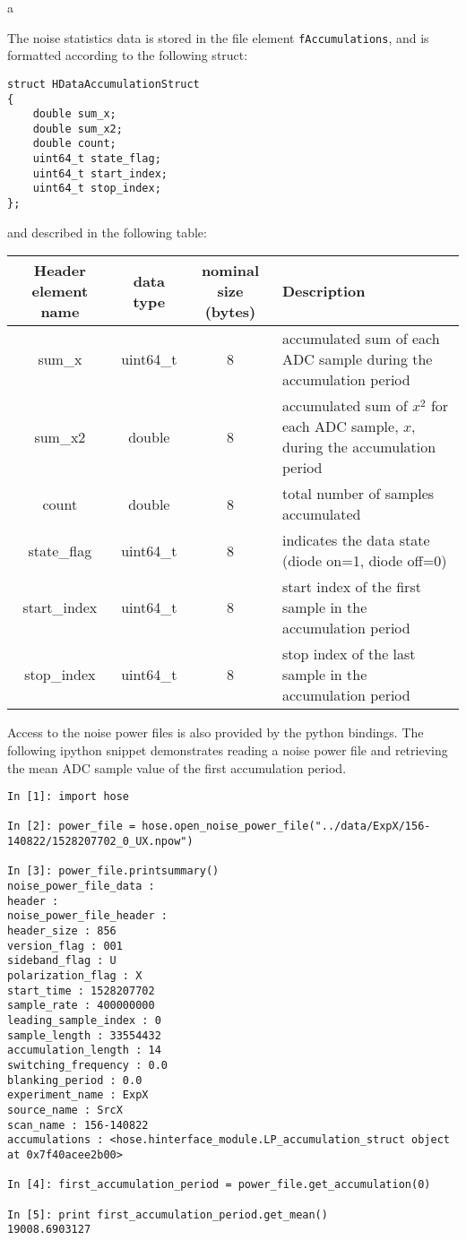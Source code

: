 a\documentclass[a4paper,14pt]{article}
\begin{document}
The noise statistics data is stored in the file element \verb|fAccumulations|, and is formatted
according to the following struct:

\begin{lstlisting}
struct HDataAccumulationStruct
{
    double sum_x; 
    double sum_x2;
    double count;
    uint64_t state_flag;
    uint64_t start_index;
    uint64_t stop_index;
};
\end{lstlisting}

and described in the following table:

\begin{center}
\begin{tabularx}{\linewidth} {| c | c | c | L |}
\hline
 Header element name & data type & nominal size (bytes) & Description \\  \hline
 sum\_x  & uint64\_t & 8 & accumulated sum of each ADC sample during the accumulation period \\ \hline
 sum\_x2  & double & 8 & accumulated sum of $x^2$ for each ADC sample, $x$, during the accumulation period \\ \hline
 count  & double & 8 & total number of samples accumulated \\ \hline
 state\_flag & uint64\_t & 8 & indicates the data state (diode on=1, diode off=0) \\ \hline
 start\_index & uint64\_t & 8 & start index of the first sample in the accumulation period \\ \hline
 stop\_index & uint64\_t & 8 & stop index of the last sample in the accumulation period \\ \hline
\end{tabularx}
\end{center}

Access to the noise power files is also provided by the python bindings. The following ipython snippet demonstrates reading a noise power file and retrieving
the mean ADC sample value of the first accumulation period.

\begin{lstlisting}
In [1]: import hose

In [2]: power_file = hose.open_noise_power_file("../data/ExpX/156-140822/1528207702_0_UX.npow")

In [3]: power_file.printsummary()
noise_power_file_data :
header :
noise_power_file_header :
header_size : 856
version_flag : 001
sideband_flag : U
polarization_flag : X
start_time : 1528207702
sample_rate : 400000000
leading_sample_index : 0
sample_length : 33554432
accumulation_length : 14
switching_frequency : 0.0
blanking_period : 0.0
experiment_name : ExpX
source_name : SrcX
scan_name : 156-140822
accumulations : <hose.hinterface_module.LP_accumulation_struct object at 0x7f40acee2b00>

In [4]: first_accumulation_period = power_file.get_accumulation(0)

In [5]: print first_accumulation_period.get_mean()
19008.6903127

\end{lstlisting}
\end{document}
